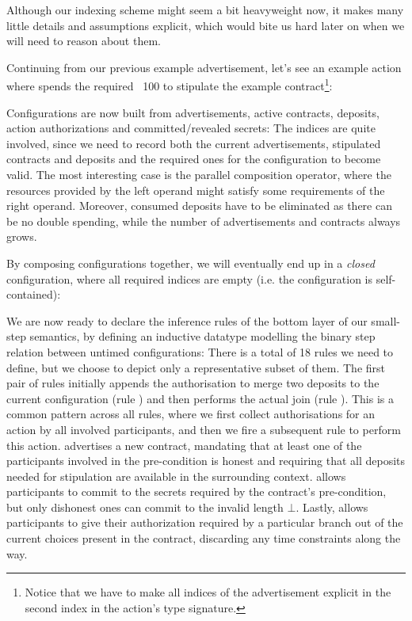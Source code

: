 \documentclass[acmsmall,nonacm=true,screen=true]{acmart}
\begin{document}
Although our indexing scheme might seem a bit heavyweight now, it makes many little details and assumptions explicit,
which would bite us hard later on when we will need to reason about them.

Continuing from our previous example advertisement, let's see an example action where \inlineA{} spends the required \bitcoin ~100
to stipulate the example contract\footnote{
Notice that we have to make all indices of the advertisement explicit in the second index in the action's type signature.
}:
\BITactionExample{}

Configurations are now built from advertisements, active contracts, deposits, action authorizations and committed/revealed secrets:
\BITconfigurationsA{}
\BITconfigurationsB{}
The indices are quite involved, since we need to record both the current advertisements, stipulated contracts and deposits
and the required ones for the configuration to become valid. The most interesting case is the parallel composition
operator, where the resources provided by the left operand might satisfy some requirements of the right operand. Moreover,
consumed deposits have to be eliminated as there can be no double spending, while the number of advertisements and contracts
always grows.

By composing configurations together, we will eventually end up in a \textit{closed} configuration, where 
all required indices are empty (i.e. the configuration is self-contained):
\BITclosedConfigurations{}

We are now ready to declare the inference rules of the bottom layer of our small-step semantics,
by defining an inductive datatype modelling the binary step relation between untimed configurations:
\BITrules{}
There is a total of 18 rules we need to define, but we choose to depict only a representative subset of them.
The first pair of rules initially appends the authorisation to merge
two deposits to the current configuration (rule \inlineAuthJoinRule{}) and then performs the actual join (rule \inlineJoinRule{}).
This is a common pattern across all rules, where we first collect authorisations for an action by all involved participants,
and then we fire a subsequent rule to perform this action.
\inlineAdvertiseRule{} advertises a new contract, mandating that at least one of the participants involved in the pre-condition
is honest and requiring that all deposits needed for stipulation are available in the surrounding context.
\inlineAuthCommitRule{} allows participants to commit to the secrets required by the contract's pre-condition, but only dishonest
ones can commit to the invalid length $\bot$.
Lastly, \inlineControlRule{} allows participants to give their authorization required by a particular branch out of the current
choices present in the contract, discarding any time constraints along the way.
\end{document}
